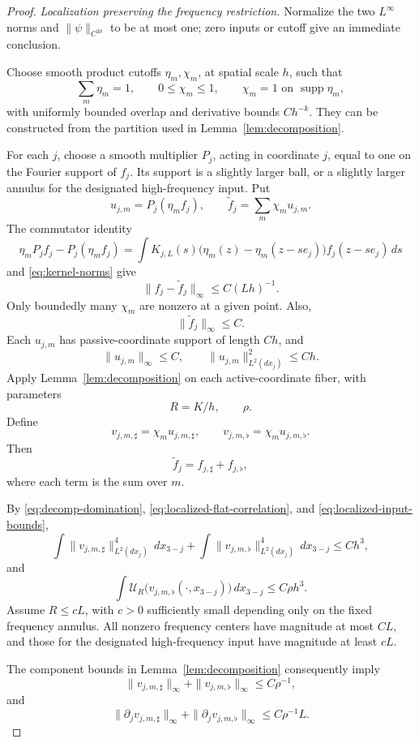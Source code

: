 \documentclass[11pt,a4paper]{article}
\DeclareMathOperator{\supp}{supp}
\begin{document}
\begin{proof}
\textit{Localization preserving the frequency restriction.}
Normalize the two $L^\infty$ norms and $\|\psi\|_{C^{20}}$ to be at most
one; zero inputs or cutoff give an immediate conclusion.

Choose smooth product cutoffs $\eta_m,\chi_m$, at spatial scale $h$, such
that
\[
\sum_m\eta_m=1,\qquad0\leq\chi_m\leq1,\qquad
\chi_m=1\text{ on }\supp\eta_m,
\]
with uniformly bounded overlap and derivative bounds $Ch^{-k}$. They can
be constructed from the partition used in Lemma~\ref{lem:decomposition}.

For each $j$, choose a smooth multiplier $P_j$, acting in coordinate $j$,
equal to one on the Fourier support of $f_j$. Its support is a slightly
larger ball, or a slightly larger annulus for the designated high-frequency
input. Put
\[
u_{j,m}=P_j(\eta_mf_j),\qquad
\widetilde f_j=\sum_m\chi_mu_{j,m}.
\tag{6.2}\label{eq:spatial-localization}
\]
The commutator identity
\[
\eta_mP_jf_j-P_j(\eta_mf_j)
=\int K_{j,L}(s)\bigl(\eta_m(z)-\eta_m(z-se_j)\bigr)
f_j(z-se_j)\,ds
\]
and \eqref{eq:kernel-norms} give
\[
\|f_j-\widetilde f_j\|_\infty\leq C(Lh)^{-1}.
\tag{6.3}\label{eq:commutator-error}
\]
Only boundedly many $\chi_m$ are nonzero at a given point. Also,
\[
\|\widetilde f_j\|_\infty\leq C.
\tag{6.4}\label{eq:localized-boundedness}
\]
Each $u_{j,m}$ has passive-coordinate support of length $Ch$, and
\[
\|u_{j,m}\|_\infty\leq C,\qquad
\|u_{j,m}\|_{L^2(dx_j)}^2\leq Ch.
\tag{6.5}\label{eq:localized-input-bounds}
\]
Apply Lemma~\ref{lem:decomposition} on each active-coordinate fiber, with
parameters
\[
R=K/h,\qquad\rho.
\]
Define
\[
v_{j,m,\sharp}=\chi_mu_{j,m,\sharp},\qquad
v_{j,m,\flat}=\chi_mu_{j,m,\flat}.
\]
Then
\[
\widetilde f_j=f_{j,\sharp}+f_{j,\flat},
\]
where each term is the sum over $m$.

By \eqref{eq:decomp-domination}, \eqref{eq:localized-flat-correlation}, and
\eqref{eq:localized-input-bounds},
\[
\int\|v_{j,m,\sharp}\|_{L^2(dx_j)}^4\,dx_{3-j}
+\int\|v_{j,m,\flat}\|_{L^2(dx_j)}^4\,dx_{3-j}\leq Ch^3,
\tag{6.6}\label{eq:decomposed-fiber-energy}
\]
and
\[
\int\mathcal U_R\bigl(v_{j,m,\flat}(\cdot,x_{3-j})\bigr)\,dx_{3-j}
\leq C\rho h^3.
\tag{6.7}\label{eq:decomposed-uniformity}
\]
Assume $R\leq cL$, with $c>0$ sufficiently small depending only on the
fixed frequency annulus. All nonzero frequency centers have magnitude at
most $CL$, and those for the designated high-frequency input have
magnitude at least $cL$.

The component bounds in Lemma~\ref{lem:decomposition} consequently imply
\[
\|v_{j,m,\sharp}\|_\infty+\|v_{j,m,\flat}\|_\infty\leq C\rho^{-1},
\]
and
\[
\|\partial_jv_{j,m,\sharp}\|_\infty
+\|\partial_jv_{j,m,\flat}\|_\infty\leq C\rho^{-1}L.
\tag{6.8}\label{eq:decomposed-derivatives}
\]


\end{proof}
\end{document}
